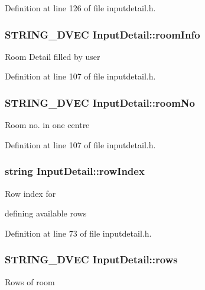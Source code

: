 Definition at line 126 of file inputdetail.\-h.

\hypertarget{classInputDetail_a7472fa615f318a2553b750529c3a4b0e}{
\subsubsection[{room\-Info}]{\setlength{\rightskip}{0pt plus 5cm}S\-T\-R\-I\-N\-G\-\_\-D\-V\-E\-C Input\-Detail\-::room\-Info\hspace{0.3cm}{\ttfamily [protected]}}}\label{classInputDetail_a7472fa615f318a2553b750529c3a4b0e}
Room Detail filled by user 

Definition at line 107 of file inputdetail.\-h.

\hypertarget{classInputDetail_a3193354764ba0b44b2eb4b366b4c273a}{
\subsubsection[{room\-No}]{\setlength{\rightskip}{0pt plus 5cm}S\-T\-R\-I\-N\-G\-\_\-D\-V\-E\-C Input\-Detail\-::room\-No\hspace{0.3cm}{\ttfamily [protected]}}}\label{classInputDetail_a3193354764ba0b44b2eb4b366b4c273a}
Room no. in one centre 

Definition at line 107 of file inputdetail.\-h.

\hypertarget{classInputDetail_a8294712a038ec4934eec54c835b20d23}{
\subsubsection[{row\-Index}]{\setlength{\rightskip}{0pt plus 5cm}string Input\-Detail\-::row\-Index\hspace{0.3cm}{\ttfamily [protected]}}}\label{classInputDetail_a8294712a038ec4934eec54c835b20d23}
\begin{DoxyVerb}     Row index for 
\end{DoxyVerb}
 defining available rows 

Definition at line 73 of file inputdetail.\-h.

\hypertarget{classInputDetail_aa203edbcfd4083624dbc4dc055c1e6e5}{
\subsubsection[{rows}]{\setlength{\rightskip}{0pt plus 5cm}S\-T\-R\-I\-N\-G\-\_\-D\-V\-E\-C Input\-Detail\-::rows\hspace{0.3cm}{\ttfamily [protected]}}}\label{classInputDetail_aa203edbcfd4083624dbc4dc055c1e6e5}
Rows of room 

